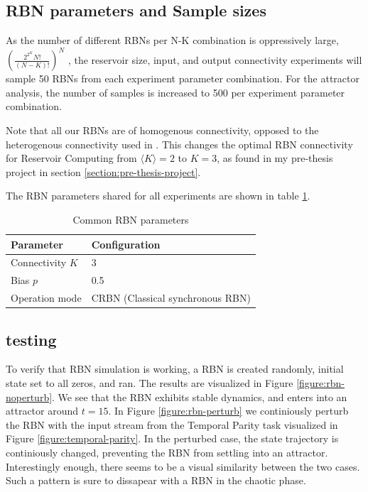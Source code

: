 \subsection{RBN parameters and Sample sizes}

As the number of different RBNs per N-K combination is oppressively large,
$(\frac{2^{2^{K}}N!}{(N-K)!})^N$ \cite{gershenson2004introduction},
the reservoir size, input, and output connectivity experiments will sample 50 RBNs from each experiment parameter combination.
For the attractor analysis, the number of samples is increased to 500 per experiment parameter combination.

Note that all our RBNs are of homogenous connectivity,
opposed to the heterogenous connectivity used in \cite{rbn-reservoir}.
This changes the optimal RBN connectivity for Reservoir Computing from $ \langle K \rangle = 2 $ to $ K = 3$,
as found in my pre-thesis project in section \ref{section:pre-thesis-project}.

The RBN parameters shared for all experiments are shown in table
\ref{table:shared-rbn-parameters}.

\begin{table}[h]
    \centering
    \caption{Common RBN parameters}
    \label{table:shared-rbn-parameters}
    \begin{tabular}{ll}
        \hline
        \textbf{Parameter} & \textbf{Configuration} \\
        \hline
        \hline
        Connectivity $K$ & 3   \\
        Bias $p$         & 0.5 \\
        Operation mode & CRBN (Classical synchronous RBN) \\
        \hline
    \end{tabular}
\end{table}

\subsection{testing}

To verify that RBN simulation is working,
a RBN is created randomly, initial state set to all zeros, and ran.
The results are visualized in Figure \ref{figure:rbn-noperturb}.
We see that the RBN exhibits stable dynamics, and enters into an attractor around $t=15$.
In Figure \ref{figure:rbn-perturb} we continiously perturb the RBN with the input stream from the Temporal Parity task visualized in Figure \ref{figure:temporal-parity}.
In the perturbed case, the state trajectory is continiously changed, preventing the RBN from settling into an attractor.
Interestingly enough, there seems to be a visual similarity between the two cases.
Such a pattern is sure to dissapear with a RBN in the chaotic phase.

